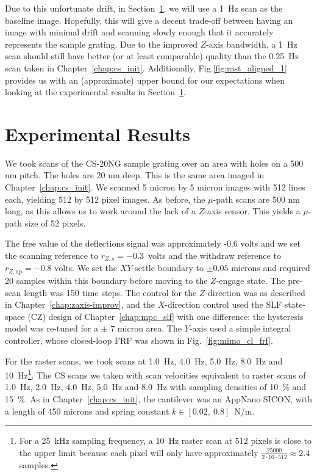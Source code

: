 \documentclass[twocolumn,twoside]{IEEEtran/IEEEtran}
\begin{document}
Due to this unfortunate drift, in Section~\ref{sec:results:final}, we will use a
1~Hz scan as the baseline image. Hopefully, this will give a decent trade-off
between having an image with minimal drift and scanning slowly enough that it
accurately represents the sample grating. Due to the improved $Z$-axis
bandwidth, a 1~Hz scan should still have better (or at least comparable) quality
than the 0.25~Hz scan taken in Chapter~\ref{chap:cs_init}. Additionally,
Fig.\ref{fig:rast_aligned_1} provides us with an (approximate) upper bound for
our expectations when looking at the experimental results in
Section~\ref{sec:results:final}.



\section{Experimental Results}\label{sec:results:final}
We took scans of the CS-20NG sample grating over an area with holes on a 500 nm
pitch. The holes are 20 nm deep. This is the same area imaged in
Chapter~\ref{chap:cs_init}. We scanned 5 micron by 5 micron images with 512
lines each, yielding 512 by 512 pixel images. As before, the $\mu$-path scans
are 500 nm long, as this allows us to work around the lack of a $Z$-axis sensor.
This yields a $\mu$-path size of 52 pixels.

The free value of the deflections signal was approximately -0.6 volts and we set
the scanning reference to $r_{Z,s}=-0.3$~volts and the withdraw reference to
$r_{Z,\textrm{up}}=-0.8$ volts. We set the $XY$-settle boundary to $\pm 0.05$
microns and required 20 samples within this boundary before moving to the
$Z$-engage state. The pre-scan length was 150 time steps. The control for the
$Z$-direction was as described in Chapter~\ref{chap:zaxis-improv}, and the
$X$-direction control used the SLF state-space (CZ) design of
Chapter~\ref{chap:mpc_slf} with one difference: the hysteresis model was
re-tuned for a $\pm$ 7 micron area. The $Y$-axis used a simple integral
controller, whose closed-loop FRF was shown in Fig.~\ref{fig:mimo_cl_frf}.

For the raster scans, we took scans at 1.0~Hz, 4.0~Hz, 5.0~Hz, 8.0~Hz and
10~Hz\footnote{For a 25~kHz sampling frequency, a 10~Hz raster scan at 512
  pixels is close to the upper limit because each pixel will only have
  approximately $ \frac{25000}{2\cdot 10 \cdot 512}\approx 2.4$ samples.}. The
CS scans we taken with scan velocities equivalent to raster scans of 1.0~Hz,
2.0~Hz, 4.0~Hz, 5.0~Hz and 8.0~Hz with sampling densities of 10~\% and 15~\%. As
in Chapter~\ref{chap:cs_init}, the cantilever was an AppNano SICON, with a
length of 450 microns and spring constant $k\in[0.02,~0.8]$~N/m.
\end{document}
